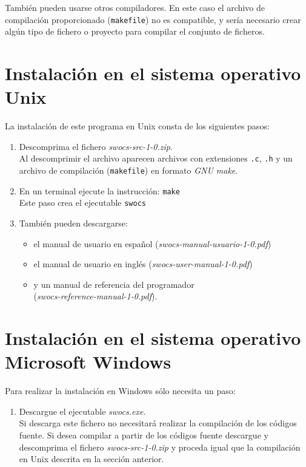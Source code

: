 \documentclass[a4paper,12pt]{report}
\begin{document}
También pueden usarse otros compiladores. En este caso el archivo de compilación
proporcionado ({\tt makefile}) no es compatible, y sería necesario crear algún
tipo de fichero o proyecto para compilar el conjunto de ficheros.


\section{Instalación en el sistema operativo Unix}

La instalación de este programa en Unix consta de los siguientes pasos:
  \begin{enumerate}
	\item Descomprima el fichero \emph{swocs-src-1-0.zip}. \\
		Al descomprimir el archivo aparecen archivos con extensiones {\tt .c},
		{\tt .h} y un archivo de compilación ({\tt makefile}) en formato
		\emph{GNU make}.
	\item En un terminal ejecute la instrucción: {\tt make} \\
			Este paso crea el ejecutable {\tt swocs} 
	\item También pueden descargarse:
		\begin{itemize}
			\item el manual de usuario en español
				({\it swocs-manual-usuario-1-0.pdf})
			\item el manual de usuario en inglés
				({\it swocs-user-manual-1-0.pdf})
			\item y un manual de referencia del programador\\
				({\it swocs-reference-manual-1-0.pdf}). 
		\end{itemize}
  \end{enumerate}

\section{Instalación en el sistema operativo Microsoft Windows}

Para realizar la instalación en Windows sólo necesita un paso: 
  \begin{enumerate}
	\item Descargue el ejecutable \emph{swocs.exe}. \\
		Si descarga este fichero no necesitará realizar la compilación de los
		códigos fuente. Si desea compilar a partir de los códigos fuente
		descargue y descomprima el fichero \emph{swocs-src-1-0.zip} y proceda
		igual que la compilación en Unix descrita en la sección anterior.
  \end{enumerate}
\end{document}

